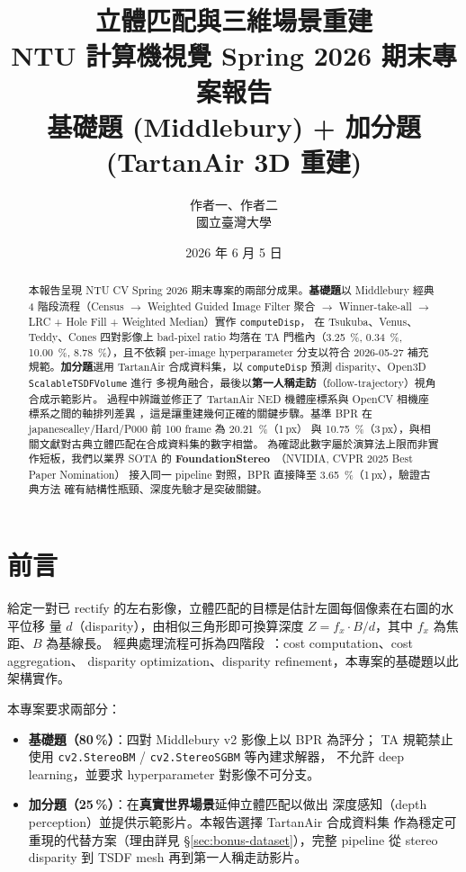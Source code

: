 \documentclass[11pt,a4paper]{article}
\title{\bfseries 立體匹配與三維場景重建\\[4pt]
       \large NTU 計算機視覺 Spring 2026 期末專案報告\\[2pt]
       \normalsize 基礎題 (Middlebury) + 加分題 (TartanAir 3D 重建)}
\author{作者一、作者二 \\ \normalsize 國立臺灣大學}
\date{2026 年 6 月 5 日}
\begin{document}
\maketitle
\thispagestyle{fancy}

\begin{abstract}
\noindent 本報告呈現 NTU CV Spring 2026 期末專案的兩部分成果。\textbf{基礎題}以
Middlebury 經典 4 階段流程（Census $\to$ Weighted Guided Image Filter 聚合
$\to$ Winner-take-all $\to$ LRC + Hole Fill + Weighted Median）實作 \texttt{computeDisp}，
在 Tsukuba、Venus、Teddy、Cones 四對影像上 bad-pixel ratio 均落在
TA 門檻內（\SI{3.25}{\percent}, \SI{0.34}{\percent}, \SI{10.00}{\percent},
\SI{8.78}{\percent}），且不依賴 per-image hyperparameter 分支以符合
2026-05-27 補充規範。\textbf{加分題}選用 TartanAir 合成資料集，以
\texttt{computeDisp} 預測 disparity、Open3D \texttt{ScalableTSDFVolume} 進行
多視角融合，最後以\textbf{第一人稱走訪}（follow-trajectory）視角合成示範影片。
過程中辨識並修正了 TartanAir NED 機體座標系與 OpenCV 相機座標系之間的軸排列差異
，這是讓重建幾何正確的關鍵步驟。基準 BPR 在
japanesealley/Hard/P000 前 100 frame 為 \SI{20.21}{\percent}（1\,px）
與 \SI{10.75}{\percent}（3\,px），與相關文獻對古典立體匹配在合成資料集的數字相當。
為確認此數字屬於演算法上限而非實作短板，我們以業界 SOTA 的
\textbf{FoundationStereo}~\cite{Wen2025}（NVIDIA, CVPR 2025 Best Paper Nomination）
接入同一 pipeline 對照，BPR 直接降至 \SI{3.65}{\percent}（1\,px），驗證古典方法
確有結構性瓶頸、深度先驗才是突破關鍵。
\end{abstract}

\section{前言}
給定一對已 rectify 的左右影像，立體匹配的目標是估計左圖每個像素在右圖的水平位移
量 $d$（disparity），由相似三角形即可換算深度
$Z = f_x \cdot B / d$，其中 $f_x$ 為焦距、$B$ 為基線長。
經典處理流程可拆為四階段~\cite{Scharstein2002}：cost computation、cost aggregation、
disparity optimization、disparity refinement，本專案的基礎題以此架構實作。

本專案要求兩部分：
\begin{itemize}[leftmargin=2em,itemsep=2pt]
\item \textbf{基礎題（80\,\%）}：四對 Middlebury v2 影像上以 BPR 為評分；
TA 規範禁止使用 \texttt{cv2.StereoBM} / \texttt{cv2.StereoSGBM} 等內建求解器，
不允許 deep learning，並要求 hyperparameter 對影像不可分支。
\item \textbf{加分題（25\,\%）}：在\textbf{真實世界場景}延伸立體匹配以做出
深度感知（depth perception）並提供示範影片。本報告選擇 TartanAir 合成資料集
作為穩定可重現的代替方案（理由詳見 §\ref{sec:bonus-dataset}），完整
pipeline 從 stereo disparity 到 TSDF mesh 再到第一人稱走訪影片。
\end{itemize}
\end{document}
